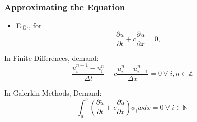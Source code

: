 \documentclass[]{beamer}
\newcommand{\Z}{\mathbb{Z}}
\newcommand{\N}{\mathbb{N}}
\newcommand{\pd}[2]{\frac{\partial #1}{\partial #2}}
\begin{document}


\begin{frame}
  \frametitle{Approximating the Equation}
  \begin{itemize}
    \item E.g., for 
      $$\pd{u}{t} + c \pd{u}{x}=0,$$
  \end{itemize}  
  \begin{block}{In Finite Differences, demand:}
    $$\frac{u_i^{n+1} - u_{i}^n}{\Delta t} + c \frac{u_{i}^n - u_{i-1}^n}{\Delta x} = 0\ \forall\ i,n\in\Z$$
  \end{block}
  \begin{block}{In Galerkin Methods, Demand:}
    $$\int_a^b \left(\pd{\tilde{u}}{t} + c \pd{\tilde{u}}{x}\right)\phi_i w dx = 0\ \forall\ i\in\N$$
  \end{block}
\end{frame}
\end{document}
